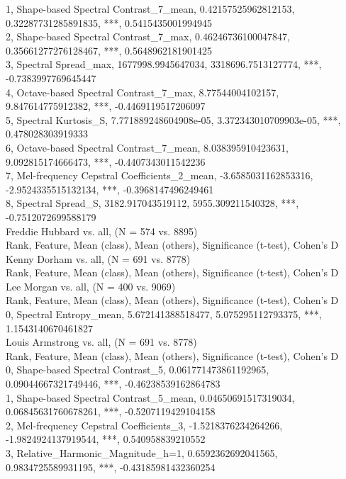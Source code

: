 1, Shape-based Spectral Contrast_7_mean, 0.42157525962812153, 0.32287731285891835, ***, 0.5415435001994945\\
2, Shape-based Spectral Contrast_7_max, 0.46246736100047847, 0.35661277276128467, ***, 0.5648962181901425\\
3, Spectral Spread_max, 1677998.9945647034, 3318696.7513127774, ***, -0.7383997769645447\\
4, Octave-based Spectral Contrast_7_max, 8.77544004102157, 9.847614775912382, ***, -0.4469119517206097\\
5, Spectral Kurtosis_S, 7.771889248604908e-05, 3.372343010709903e-05, ***, 0.478028303919333\\
6, Octave-based Spectral Contrast_7_mean, 8.038395910423631, 9.092815174666473, ***, -0.4407343011542236\\
7, Mel-frequency Cepstral Coefficients_2_mean, -3.6585031162853316, -2.9524335515132134, ***, -0.3968147496249461\\
8, Spectral Spread_S, 3182.917043519112, 5955.309211540328, ***, -0.7512072699588179\\
Freddie Hubbard vs. all, (N = 574 vs. 8895)\\
Rank, Feature, Mean (class), Mean (others), Significance (t-test), Cohen's D\\
Kenny Dorham vs. all, (N = 691 vs. 8778)\\
Rank, Feature, Mean (class), Mean (others), Significance (t-test), Cohen's D\\
Lee Morgan vs. all, (N = 400 vs. 9069)\\
Rank, Feature, Mean (class), Mean (others), Significance (t-test), Cohen's D\\
0, Spectral Entropy_mean, 5.672141388518477, 5.075295112793375, ***, 1.1543140670461827\\
Louis Armstrong vs. all, (N = 691 vs. 8778)\\
Rank, Feature, Mean (class), Mean (others), Significance (t-test), Cohen's D\\
0, Shape-based Spectral Contrast_5, 0.061771473861192965, 0.09044667321749446, ***, -0.46238539162864783\\
1, Shape-based Spectral Contrast_5_mean, 0.04650691517319034, 0.06845631760678261, ***, -0.5207119429104158\\
2, Mel-frequency Cepstral Coefficients_3, -1.5218376234264266, -1.9824924137919544, ***, 0.540958839210552\\
3, Relative_Harmonic_Magnitude_h=1, 0.6592362692041565, 0.9834725589931195, ***, -0.43185981432360254\\

